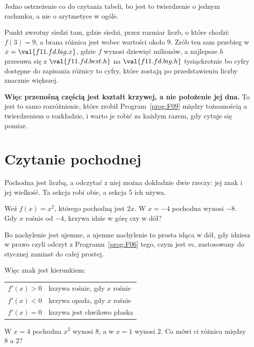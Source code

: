 \begin{fr}
Jedno ostrzeżenie co do czytania tabeli, bo jest to twierdzenie o jednym
rachunku, a nie o arytmetyce w ogóle.

Punkt zwrotny siedzi tam, gdzie siedzi, przez rozmiar liczb, o które chodzi:
$f(3) = 9$, a brana różnica jest wobec wartości około $9$. Zrób ten sam
przebieg w $x = \val{f11.fd.big.x}$, gdzie $f$ wynosi dziewięć milionów, a
najlepsze $h$ przesuwa się z $\val{f11.fd.best.h}$ na $\val{f11.fd.big.h}$
\dash{} tysiąckrotnie \dash{} bo cyfry dostępne do zapisania różnicy to cyfry,
które zostają po przedstawieniu liczby znacznie większej.

\textbf{Więc przenośną częścią jest kształt krzywej, a nie położenie jej
dna.} To jest to samo rozróżnienie, które zrobił Program~\ref{prog:F09} między
tożsamością a twierdzeniem o rozkładzie, i warto je robić za każdym razem, gdy
cytuje się pomiar.
\end{fr}

\section{Czytanie pochodnej}
\label{sec:F11-reading}

\begin{fr}
Pochodna jest liczbą, a odczytać z niej można dokładnie dwie rzeczy: jej znak
i jej wielkość. Ta sekcja robi obie, a sekcja 5 ich używa.

Weź $f(x) = x^{2}$, którego pochodną jest $2x$. W $x = -4$ pochodna wynosi
$-8$. Gdy $x$ rośnie od $-4$, krzywa idzie w górę czy w dół?
\nextframe
\end{fr}

\begin{fr}
Bo nachylenie jest ujemne, a ujemne nachylenie to prosta idąca w dół, gdy
idziesz w prawo \dash{} czyli odczyt z Programu~\ref{prog:F06} tego, czym
jest $m$, zastosowany do stycznej zamiast do całej prostej.

Więc znak jest kierunkiem:

\begin{center}
\begin{tabular}{ll}
\toprule
$f'(x) > 0$ & krzywa rośnie, gdy $x$ rośnie \\
$f'(x) < 0$ & krzywa opada, gdy $x$ rośnie \\
$f'(x) = 0$ & krzywa jest chwilowo płaska \\
\bottomrule
\end{tabular}
\end{center}

W $x = 4$ pochodna $x^{2}$ wynosi $8$, a w $x = 1$ wynosi $2$. Co mówi ci
różnica między $8$ a $2$?
\nextframe
\end{fr}

